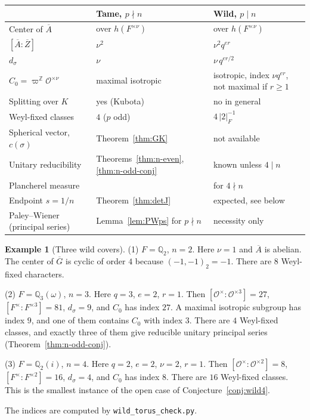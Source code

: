 \documentclass[12pt,letterpaper]{article}
\numberwithin{equation}{section}
\theoremstyle{definition}
\newtheorem{example}[theorem]{Example}
\newcommand{\Z}{\mathbb Z}
\newcommand{\Q}{\mathbb Q}
\newcommand{\OF}{\mathcal O}
\newcommand{\vp}{\varpi}
\newcommand{\bG}{\overline{G}}
\newcommand{\bA}{\overline{A}}
\newcommand{\bZ}{\overline{Z}}
\begin{document}
\begin{center}\small
\begin{tabular}{@{}>{\raggedright}p{4.2cm}>{\raggedright}p{5.2cm}>{\raggedright\arraybackslash}p{5.6cm}@{}}
\toprule
 & \textbf{Tame, $p\nmid n$} & \textbf{Wild, $p\mid n$}\\
\midrule
Center of $\bA$ & over $h(F^{\times\nu})$ & over $h(F^{\times\nu})$\\
$[\bA:\bZ]$ & $\nu^2$ & $\nu^2q^{er}$\\
$d_\sigma$ & $\nu$ & $\nu\,q^{er/2}$\\
$C_0=\vp^{\Z}\OF^{\times\nu}$ & maximal isotropic & isotropic, index $\nu q^{er}$, not maximal if $r\ge1$\\
Splitting over $K$ & yes (Kubota) & no in general\\
Weyl-fixed classes & $4$ ($p$ odd) & $4\,|2|_F^{-1}$\\
Spherical vector, $c(\sigma)$ & Theorem~\ref{thm:GK} & not available\\
Unitary reducibility & Theorems~\ref{thm:n-even}, \ref{thm:n-odd-conj} & known unless $4\mid n$\\
Plancherel measure & \cite{GS16} & \cite{Sz19} for $4\nmid n$\\
Endpoint $s=1/n$ & Theorem~\ref{thm:detJ} & expected, see below\\
Paley--Wiener (principal series) & Lemma~\ref{lem:PWps} for $p\nmid n$ & necessity only\\
\bottomrule
\end{tabular}
\end{center}

\begin{example}[Three wild covers]\label{ex:wild}
(1) $F=\Q_2$, $n=2$.  Here $\nu=1$ and $\bA$ is abelian.  The center of $\bG$ is cyclic of
order $4$ because $(-1,-1)_2=-1$.  There are $8$ Weyl-fixed characters.

(2) $F=\Q_3(\omega)$, $n=3$.  Here $q=3$, $e=2$, $r=1$.  Then $[\OF^\times:\OF^{\times3}]=27$,
$[F^\times:F^{\times3}]=81$, $d_\sigma=9$, and $C_0$ has index $27$.  A maximal isotropic
subgroup has index $9$, and one of them contains $C_0$ with index $3$.  There are $4$ Weyl-fixed
classes, and exactly three of them give reducible unitary principal series
(Theorem~\ref{thm:n-odd-conj}).

(3) $F=\Q_2(i)$, $n=4$.  Here $q=2$, $e=2$, $\nu=2$, $r=1$.  Then
$[\OF^\times:\OF^{\times2}]=8$, $[F^\times:F^{\times2}]=16$, $d_\sigma=4$, and $C_0$ has index
$8$.  There are $16$ Weyl-fixed classes.  This is the smallest instance of the open case
of Conjecture~\ref{conj:wild4}.

The indices are computed by \texttt{wild\_torus\_check.py}.
\end{example}
\end{document}
